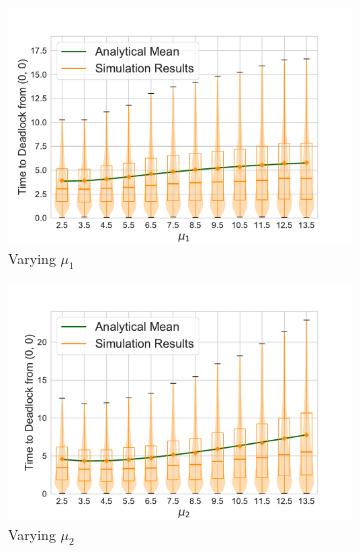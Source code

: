 \documentclass{article}
\numberwithin{equation}{section}
\begin{document}
\begin{figure}[!htbp]
\begin{center}
\begin{subfigure}[b]{0.48\textwidth}
  \label{fig:timestodeadlockfb_L2}
\end{subfigure}\\
\begin{subfigure}[b]{0.48\textwidth}
  \includegraphics[width=\textwidth]{images/2Nmsfb_varymu1}
  \caption{Varying $\mu_1$}
  \label{fig:timestodeadlockfb_mu1}
\end{subfigure}
\begin{subfigure}[b]{0.48\textwidth}
  \includegraphics[width=\textwidth]{images/2Nmsfb_varymu2}
  \caption{Varying $\mu_2$}
  \label{fig:timestodeadlockfb_mu2}
\end{subfigure}\\
\begin{subfigure}[b]{0.48\textwidth}

\end{subfigure}
\end{center}
\end{figure}
\end{document}
